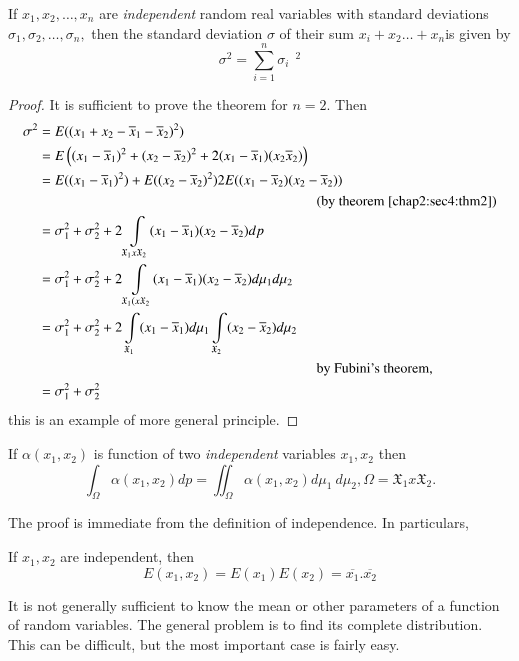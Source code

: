 \begin{theorem}\label{chap2:sec4:thm3} %
  If $x_1,x_2, \ldots ,x_n$ are \textit{independent} random real variables with
  standard deviations $\sigma_1,\sigma_2,\ldots ,\sigma_n,$ then the
  standard deviation $\sigma$ of their sum $x_i+x_2\ldots +x_n$is given by 
  $$
  \sigma^2= \sum^n_{i=1} \sigma_i~~^2
  $$
\end{theorem}

\begin{proof}
  It is sufficient to prove the theorem for $n=2$. Then
  \begin{align*}
    \sigma^2 & = E((x_1+x_2-\overline{x}_1-\overline{x}_2)^2)\\
    & =E \left((x_1
    -\overline{x}_1)^2 + (x_2 - \overline{x}_2)^2 +
    2(x_1-\overline{x}_1) (x_2 \overline{x}_2)\right) \\ 
    & =E((x_1-\overline{x}_1)^2)+E((x_2-\overline{x}_2)^2)
    2E((x_1-\overline{x}_2 )  (x_2-\overline{x}_2))\\   
    & \hspace{7cm}{\text{(by theorem \ref{chap2:sec4:thm2})}}\\ 
    & =\sigma_1^2+\sigma^2_2 +2 \int\limits_{\mathfrak{X}_1 x \mathfrak{X}_2}
    (x_1-\overline{x}_1)(x_2-\overline{x}_2) dp\\ 
    & =\sigma_1^2+\sigma_2^2+2 \int\limits_{\mathfrak{X}_1 (x
      \mathfrak{X}_2} (x_1-\overline{x}_1) (x_2-\overline{x}_2) d
    \mu_1 d \mu_2\\ 
    & =\sigma^2_1+\sigma^2_2+2 \int\limits_{\mathfrak{X}_1}
    (x_1-\overline{x}_1) d \mu_1 \int\limits_{\mathfrak{X}_2}
    (x_2-\overline{x}_2) d \mu_2\\ 
       & \hspace{7cm} \text{by Fubini's theorem,}\\
       &   =\sigma^2_1 +\sigma^2_2
  \end{align*}\pageoriginale
  this is an example of more general principle.
\end{proof}

\begin{theorem}\label{chap2:sec4:thm4} %
  If $\alpha(x_1,x_2)$ is function of two \textit{independent}
  variables $x_1,x_2$ then 
  $$
  \int_\Omega \alpha(x_1,x_2)dp=  \iint_\Omega \alpha(x_1,x_2)d
  \mu_1 ~d\mu_2, \Omega=\mathfrak{X}_1 x \mathfrak{X}_2.
  $$
\end{theorem}

  The proof is immediate from the definition of independence. In particulars,
\begin{theorem}\label{chap2:sec4:thm5}%
  If $x_1,x_2$ are independent, then
  $$
  E(x_1,x_2)=E(x_1)E(x_2)=\overline{x_1}.\overline{x_2}
  $$
  
  It is not generally sufficient to know the mean or other parameters of
  a function of random variables. The general problem is to find its
  complete distribution. This can be difficult, but the most important
  case is fairly easy.     
\end{theorem}

